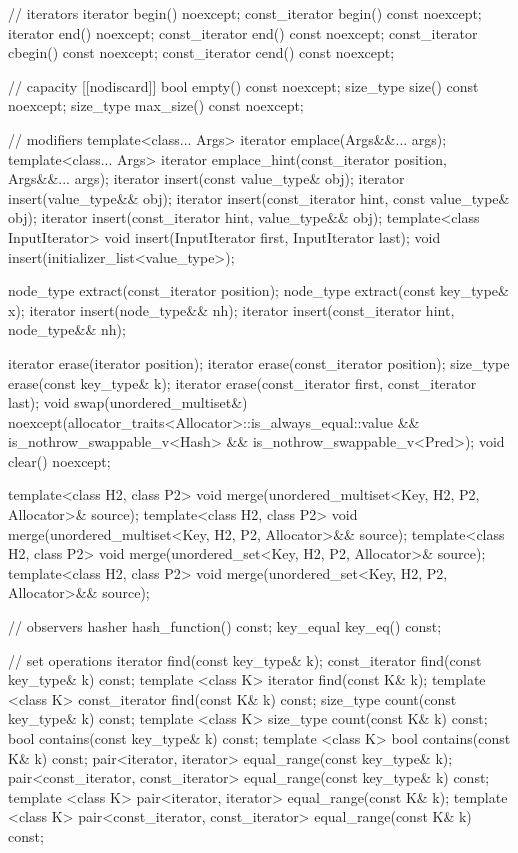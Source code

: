 \begin{codeblock}
{{    // iterators
    iterator       begin() noexcept;
    const_iterator begin() const noexcept;
    iterator       end() noexcept;
    const_iterator end() const noexcept;
    const_iterator cbegin() const noexcept;
    const_iterator cend() const noexcept;

    // capacity
    [[nodiscard]] bool empty() const noexcept;
    size_type size() const noexcept;
    size_type max_size() const noexcept;

    // modifiers
    template<class... Args> iterator emplace(Args&&... args);
    template<class... Args> iterator emplace_hint(const_iterator position, Args&&... args);
    iterator insert(const value_type& obj);
    iterator insert(value_type&& obj);
    iterator insert(const_iterator hint, const value_type& obj);
    iterator insert(const_iterator hint, value_type&& obj);
    template<class InputIterator> void insert(InputIterator first, InputIterator last);
    void insert(initializer_list<value_type>);

    node_type extract(const_iterator position);
    node_type extract(const key_type& x);
    iterator insert(node_type&& nh);
    iterator insert(const_iterator hint, node_type&& nh);

    iterator  erase(iterator position);
    iterator  erase(const_iterator position);
    size_type erase(const key_type& k);
    iterator  erase(const_iterator first, const_iterator last);
    void      swap(unordered_multiset&)
      noexcept(allocator_traits<Allocator>::is_always_equal::value &&
               is_nothrow_swappable_v<Hash> &&
               is_nothrow_swappable_v<Pred>);
    void      clear() noexcept;

    template<class H2, class P2>
      void merge(unordered_multiset<Key, H2, P2, Allocator>& source);
    template<class H2, class P2>
      void merge(unordered_multiset<Key, H2, P2, Allocator>&& source);
    template<class H2, class P2>
      void merge(unordered_set<Key, H2, P2, Allocator>& source);
    template<class H2, class P2>
      void merge(unordered_set<Key, H2, P2, Allocator>&& source);

    // observers
    hasher hash_function() const;
    key_equal key_eq() const;

    // set operations
    iterator         find(const key_type& k);
    const_iterator   find(const key_type& k) const;
    template <class K>
      iterator       find(const K& k);
    template <class K>
      const_iterator find(const K& k) const;
    size_type        count(const key_type& k) const;
    template <class K>
      size_type      count(const K& k) const;
    bool             contains(const key_type& k) const;
    template <class K>
      bool           contains(const K& k) const;
    pair<iterator, iterator>               equal_range(const key_type& k);
    pair<const_iterator, const_iterator>   equal_range(const key_type& k) const;
    template <class K>
      pair<iterator, iterator>             equal_range(const K& k);
    template <class K>
      pair<const_iterator, const_iterator> equal_range(const K& k) const;

}}
\end{codeblock}
